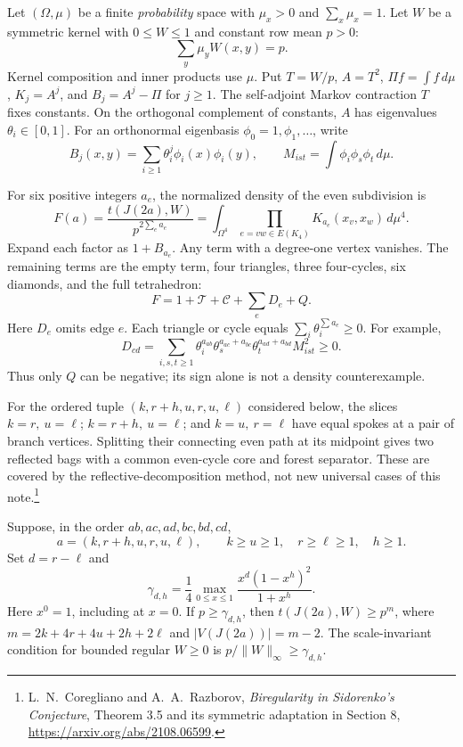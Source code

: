Let $(\Omega,\mu)$ be a finite \emph{probability} space with
$\mu_x>0$ and $\sum_x\mu_x=1$.  Let $W$ be a symmetric kernel with
$0\leq W\leq1$ and constant row mean $p>0$:
\[
 \sum_y\mu_yW(x,y)=p.
\]
Kernel composition and inner products use $\mu$.  Put
$T=W/p$, $A=T^2$, $\Pi f=\int f\,d\mu$,
$K_j=A^j$, and $B_j=A^j-\Pi$ for $j\geq1$.
The self-adjoint Markov contraction $T$ fixes constants.  On the orthogonal
complement of constants, $A$ has eigenvalues $\theta_i\in[0,1]$.
For an orthonormal eigenbasis $\phi_0=1,\phi_1,\ldots$, write
\[
 B_j(x,y)=\sum_{i\geq1}\theta_i^j\phi_i(x)\phi_i(y),
 \qquad M_{ist}=\int\phi_i\phi_s\phi_t\,d\mu.
\]

For six positive integers $a_e$, the normalized density of the even
subdivision is
\[
 F(a)=\frac{t(J(2a),W)}{p^{2\sum_ea_e}}
     =\int_{\Omega^4}\prod_{e=vw\in E(K_4)}K_{a_e}(x_v,x_w)\,d\mu^4.
\]
Expand each factor as $1+B_{a_e}$.  Any term with a degree-one vertex
vanishes.  The remaining terms are the empty term, four triangles,
three four-cycles, six diamonds, and the full tetrahedron:
\begin{equation}
 F=1+\mathcal T+\mathcal C+\sum_eD_e+Q.
 \label{eq:rank3-complete-expansion}
\end{equation}
Here $D_e$ omits edge $e$.  Each triangle or cycle equals
$\sum_i\theta_i^{\sum a_e}\geq0$.
For example,
\[
 D_{cd}=\sum_{i,s,t\geq1}
 \theta_i^{a_{ab}}\theta_s^{a_{ac}+a_{bc}}
 \theta_t^{a_{ad}+a_{bd}}M_{ist}^2\geq0.
\]
Thus only $Q$ can be negative; its sign alone is not a density counterexample.

For the ordered tuple $(k,r+h,u,r,u,\ell)$ considered below, the slices
$k=r,\ u=\ell$; $k=r+h,\ u=\ell$; and $k=u,\ r=\ell$
have equal spokes at a pair of branch vertices.  Splitting their connecting
even path at its midpoint gives two reflected bags with a common even-cycle
core and forest separator.  These are covered by the reflective-decomposition
method, not new universal cases of this note.\footnote{L.~N.~Coregliano
and A.~A.~Razborov, \emph{Biregularity in Sidorenko's Conjecture},
Theorem 3.5 and its symmetric adaptation in Section 8,
\url{https://arxiv.org/abs/2108.06599}.}

\begin{proposition}
Suppose, in the order $ab,ac,ad,bc,bd,cd$,
\[
 a=(k,r+h,u,r,u,\ell),\qquad
 k\geq u\geq1,\quad r\geq\ell\geq1,\quad h\geq1.
\]
Set $d=r-\ell$ and
\[
 \gamma_{d,h}=\frac14\max_{0\leq x\leq1}
       \frac{x^d(1-x^h)^2}{1+x^h}.
\]
Here $x^0=1$, including at $x=0$.
If $p\geq\gamma_{d,h}$, then $t(J(2a),W)\geq p^m$, where
$m=2k+4r+4u+2h+2\ell$ and $|V(J(2a))|=m-2$.
The scale-invariant condition for bounded regular $W\geq0$ is
$p/\|W\|_\infty\geq\gamma_{d,h}$.
\end{proposition}


